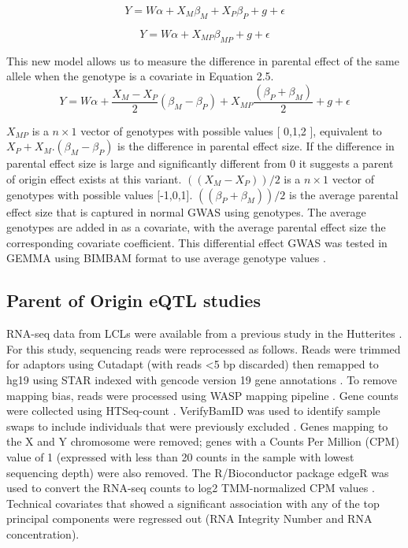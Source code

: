 \begin{equation}
Y =W\alpha + X_{M}\beta_{M}+ X_{P}\beta_{P}+g+\epsilon
\end{equation}

\begin{equation}
Y =W\alpha + X_{MP}\beta_{MP}+g+\epsilon
\end{equation}

This new model allows us to measure the difference in parental effect of the same allele when the genotype is a covariate in Equation 2.5. 
\begin{equation}
Y =W\alpha + \frac{X_{M}-X_{P}}{2}(\beta_{M}-\beta_{P}) + X_{MP}\frac{(\beta_{P}+\beta_{M})}{2} +g+\epsilon
\end{equation}

$X_{MP}$ is a $n \times 1$ vector of genotypes with possible values [ 0,1,2 ], equivalent to $X_P+ X_M. (\beta_M-\beta_P )$ is the difference in parental effect size. If the difference in parental effect size is large and significantly different from 0 it suggests a parent of origin effect exists at this variant. $((X_M-X_P ))/2$ is a $n \times 1$ vector of genotypes with possible values [-1,0,1].  $((\beta_P+\beta_M))/2$   is the average parental effect size that is captured in normal GWAS using genotypes. The average genotypes are added in as a covariate, with the average parental effect size the corresponding covariate coefficient. This differential effect GWAS was tested in GEMMA using BIMBAM format to use average genotype values \cite{Servin:2007gj}.


\subsection{Parent of Origin eQTL studies}\label{Parent of Origin eQTL studies}

RNA-seq data from LCLs were available from a previous study in the Hutterites \cite{Cusanovich:2016id}. For this study, sequencing reads were reprocessed as follows. Reads were trimmed for adaptors using Cutadapt (with reads \textless5 bp discarded) then remapped to hg19 using STAR indexed with gencode version 19 gene annotations \cite{Dobin:2002by,Martin:2011eu}. To remove mapping bias, reads were processed using WASP mapping pipeline \cite{vandeGeijn:2015hi}. Gene counts were collected using HTSeq-count \cite{Anders:2015gf}. VerifyBamID was used to identify sample swaps to include individuals that were previously excluded \cite{Jun:2012je}. Genes mapping to the X and Y chromosome were removed; genes with a Counts Per Million (CPM) value of 1 (expressed with less than 20 counts in the sample with lowest sequencing depth) were also removed. The R/Bioconductor package edgeR was used to convert the RNA-seq counts to log2 TMM-normalized CPM values \cite{Robinson:2010dd,Robinson:2010cw}. Technical covariates that showed a significant association with any of the top principal components were regressed out (RNA Integrity Number and RNA concentration).



